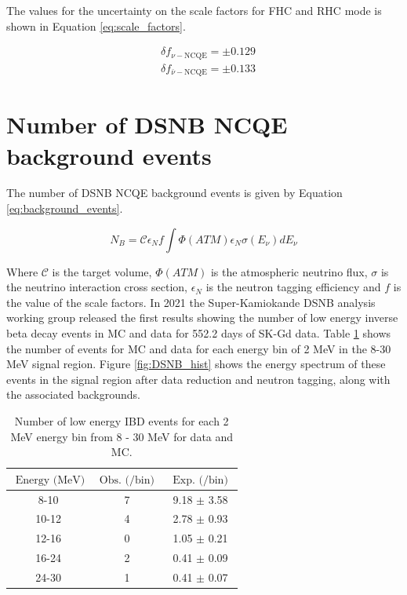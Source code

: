 The values for the uncertainty on the scale factors for FHC and RHC mode is shown in Equation \ref{eq:scale_factors}.


\begin{equation}
    \begin{aligned}
    & \delta{f_{\nu-\mathrm{NCQE}}}= \pm 0.129 \\
    & \delta{f_{\bar{\nu}-\mathrm{NCQE}}}= \pm 0.133
    \label{eq:scale_factors}
    \end{aligned}
\end{equation}


\section{Number of DSNB NCQE background events}

The number of DSNB NCQE background events is given by Equation \ref{eq:background_events}. 

\begin{equation}
N_{B} = \mathcal{C} \epsilon_{N} f\int \Phi(ATM) \epsilon_{N} \sigma(E_{\nu}) d E_{\nu} 
\label{eq:background_events}
\end{equation}

Where $\mathcal{C}$ is the target volume, $\Phi(ATM)$ is the atmospheric neutrino flux, $\sigma$ is the neutrino interaction cross section, $\epsilon_{N}$ is the neutron tagging efficiency and $f$ is the value of the scale factors. In 2021 the Super-Kamiokande DSNB analysis working group released the first results showing the number of low energy inverse beta decay events in MC and data for 552.2 days of SK-Gd data. Table \ref{table:DSNB_analysis} shows the number of events for MC and data for each energy bin of 2 MeV in the 8-30 MeV signal region. Figure \ref{fig:DSNB_hist} shows the energy spectrum of these events in the signal region after data reduction and neutron tagging, along with the associated backgrounds.

\begin{table}[!htb]
\centering
\begin{tabular}{||ccc||}
\hline
$\text{ Energy (MeV)}$ & $\text{ Obs. (/bin) }$ & $\text{ Exp. (/bin) }$\\
\hline 
8-10 & 7 & 9.18 $\pm$ 3.58 \\
10-12 & 4 & 2.78 $\pm$ 0.93 \\
12-16 & 0 & 1.05 $\pm$ 0.21 \\
16-24 & 2 & 0.41 $\pm$ 0.09 \\
24-30 & 1 & 0.41 $\pm$ 0.07 \\
\hline
\end{tabular}
\caption{Number of low energy IBD events for each 2 MeV energy bin from 8 - 30 MeV for data and MC.}
\label{table:DSNB_analysis}
\end{table}


